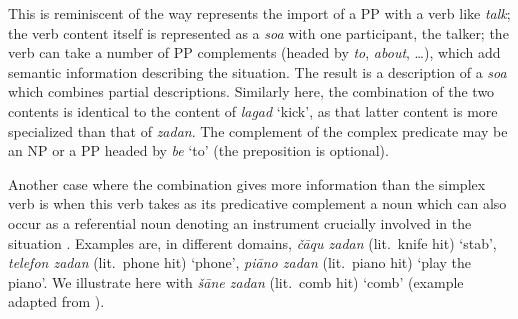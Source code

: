 This is reminiscent of the way
\citet{Wechsler1995c} represents the import of a PP with a verb like \emph{talk}; the verb content
itself is represented as a \emph{soa} with one participant, the talker; the verb can take a number
of PP complements (headed by \emph{to}, \emph{about}, \ldots), which add semantic information
describing the situation. The result is a description of a \emph{soa} which combines partial
descriptions. Similarly here, the combination of the two contents is identical to the content of
\emph{lagad} `kick', as that latter content is more specialized than that of \emph{zadan}. The
complement of the complex predicate may be an NP or a PP headed by \emph{be} `to' (the preposition
is optional).


\ea
\label{GSexemple76}
\z

\noindent
Another case where the combination gives more information than the simplex verb is when this verb
takes as its predicative complement a noun which can also occur as a referential noun denoting an
instrument crucially involved in the situation \citep{bonami2010persian}. Examples are, in different
domains, \emph{\v c\=aqu zadan} (lit.\ knife hit) `stab', \emph{telefon zadan} (lit.\ phone hit)
`phone', \emph{pi\=ano zadan} (lit.\ piano hit) `play the piano'. We illustrate here with \emph{\v
  s\=ane zadan} (lit.\ comb hit) `comb' (example adapted from \citealt{bonami2010persian}).    

\z

\ea
\label{GSexemple78}
\z

